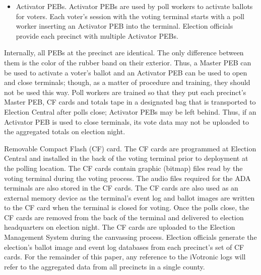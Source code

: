 \documentclass[letterpaper,twocolumn,10pt]{article}
\begin{document}
\begin{description}
\begin{itemize}
  (through PEB readers) and included in the official tally.
\item{Activator PEBs.} Activator PEBs are used by poll workers to activate ballots
  for voters. Each voter's session with the voting terminal starts with a poll
  worker inserting an Activator PEB into the terminal. Election officials provide 
  each precinct with multiple Activator PEBs. 
\end{itemize}

Internally, all PEBs at the precinct are identical. The only
difference between them is the color of the rubber band on their
exterior. Thus, a Master PEB can be used to activate a voter's ballot
and an Activator PEB can be used to open and close terminals; though,
as a matter of procedure and training, they should not be used this
way. Poll workers are trained so that they put each precinct's Master
PEB, CF cards and totals tape in a designated bag that is
transported to Election Central after polls close; Activator PEBs
may be left behind. Thus, if an Activator PEB is used to close terminals, its
vote data may not be uploaded to the aggregated totals on
election night.

\item{Removable Compact Flash (CF) card.} The CF cards are programmed at Election
  Central and installed in the back of the voting terminal prior to deployment
  at the polling location. The CF cards contain graphic (bitmap) files read by 
  the voting terminal during the voting process. The audio files required for the 
  ADA terminals are also stored in the CF cards. The CF cards are also used as an 
  external memory device as the terminal's event log and ballot images are written 
  to the CF card when the terminal is closed for voting. Once the polls close, the 
  CF cards are removed from the back of the terminal and delivered to election 
  headquarters on election night. The CF cards are uploaded to the Election Management 
  System during the canvassing process. Election officials generate the election's 
  ballot image and event log databases from each precinct's set of CF cards.  For the 
  remainder of this paper, any reference to the iVotronic logs will refer to the 
  aggregated data from all precincts in a single county.
\end{description}
\end{document}
